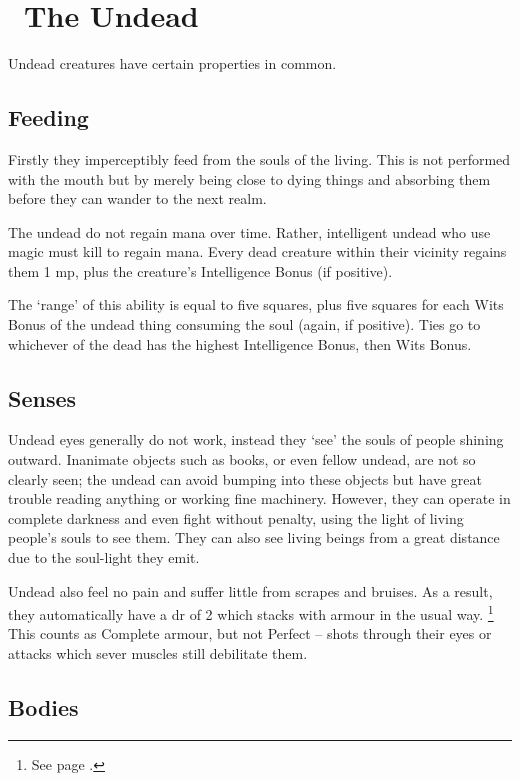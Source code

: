 \section[The Undead]{\D~The Undead}
\label{undead}

\begin{multicols}{2}

\noindent
Undead creatures have certain properties in common.

\subsection{Feeding}
Firstly they imperceptibly feed from the souls of the living.
This is not performed with the mouth but by merely being close to dying things and absorbing them before they can wander to the next realm.

The undead do not regain mana over time.
Rather, intelligent undead who use magic must kill to regain mana.
Every dead creature within their vicinity regains them 1 \gls{mp}, plus the creature's Intelligence Bonus (if positive).

The `range' of this ability is equal to five squares, plus five squares for each Wits Bonus of the undead thing consuming the soul (again, if positive).
Ties go to whichever of the dead has the highest Intelligence Bonus, then Wits Bonus.

\subsection{Senses}

Undead eyes generally do not work, instead they `see' the souls of people shining outward.
Inanimate objects such as books, or even fellow undead, are not so clearly seen; the undead can avoid bumping into these objects but have great trouble reading anything or working fine machinery.
However, they can operate in complete darkness and even fight without penalty, using the light of living people's souls to see them.
They can also see living beings from a great distance due to the soul-light they emit.

Undead also feel no pain and suffer little from scrapes and bruises.
As a result, they automatically have a \gls{dr} of 2 which stacks with armour in the usual way.%
\footnote{See page \pageref{stackingarmour}.}
This counts as Complete armour, but not Perfect -- shots through their eyes or attacks which sever muscles still debilitate them.

\subsection{Bodies}


\end{multicols}
